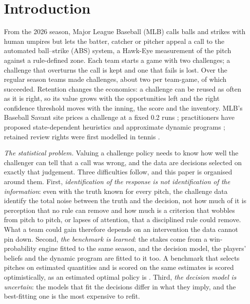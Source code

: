 \documentclass[aoas]{imsart}
\theoremstyle{plain}
\theoremstyle{definition}
\begin{document}

\section{Introduction}\label{sec:intro}

From the 2026 season, Major League Baseball (MLB) calls balls and strikes with human umpires but lets the batter,
catcher or pitcher appeal a call to the automated ball--strike (ABS) system, a Hawk-Eye measurement of the pitch
against a rule-defined zone. Each team starts a game with two challenges; a challenge that overturns the call is
kept and one that fails is lost. Over the regular season teams made \NChallenges{} challenges, about two per
team-game, of which \NOverturned{} succeeded. Retention changes the economics: a challenge can be reused as often as
it is right, so its value grows with the opportunities left and the right confidence threshold moves with the inning,
the score and the inventory. MLB's Baseball Savant site prices a challenge at a fixed 0.2 runs
\citep{Savant2026abs,Tango2026costbenefit}; practitioners have proposed state-dependent heuristics
\citep{Hamm2026cls,Goldstein2026crv} and approximate dynamic programs \citep{Arora2026use,Namuduri2026runs}; retained
review rights were first modelled in tennis \citep{ClarkeNorman2012,NadimpalliHasenbein2013,AbramitzkyEtAl2012}.

\emph{The statistical problem.} Valuing a challenge policy needs to know how well the challenger can tell that a call
was wrong, and the data are decisions selected on exactly that judgement. Three difficulties follow, and this paper is
organised around them. First, \emph{identification of the response is not identification of the information}: even
with the truth known for every pitch, the challenge data identify the total noise between the truth and the
decision, not how much of it is perception that no rule can remove and how much is a criterion that wobbles from
pitch to pitch, or lapses of attention, that a disciplined rule could remove. What a team could gain therefore depends
on an intervention the data cannot pin down. Second, \emph{the benchmark is learned}: the stakes come from a
win-probability engine fitted to the same season, and the decision model, the players' beliefs and the dynamic program
are fitted to it too. A benchmark that selects pitches on estimated quantities and is scored on the same estimates is
scored optimistically, as an estimated optimal policy is \citep{KitagawaTetenov2018,AtheyWager2021}. Third, \emph{the
decision model is uncertain}: the models that fit the decisions differ in what they imply, and the best-fitting one
is the most expensive to refit.
\end{document}
